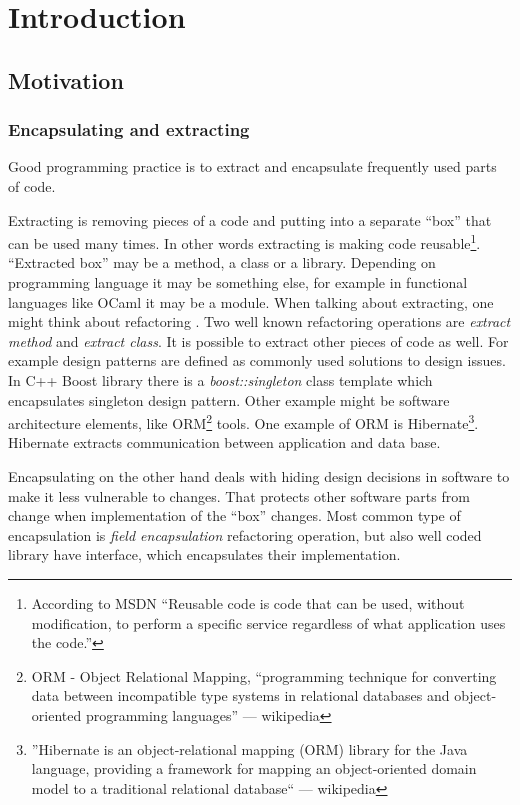 \chapter{Introduction}
\section{Motivation}
\subsection{Encapsulating and extracting}


Good programming practice is to extract and encapsulate frequently used parts of code.

Extracting is removing pieces of a code and putting into a separate ``box'' that can be used many times.
In other words extracting is making code reusable\footnote{According to MSDN ``Reusable code is code that can be used, without modification, to perform a specific service regardless of what application uses the code.''}.
``Extracted box'' may be a method, a class or a library. Depending on programming language it may be something else, 
for example in functional languages like OCaml it may be a module.
When talking about extracting, one might think about refactoring \cite{fowler06}. Two well known refactoring operations are \emph{extract method} and \emph{extract class}. It is possible to extract other pieces of code as well.
For example design patterns \cite{gamma05} are defined as commonly used solutions to design issues. In C++ Boost library there is a \emph{boost::singleton} class template which encapsulates singleton design pattern. Other example might be software architecture elements, like ORM\footnote{ORM - Object Relational Mapping, ``programming technique for converting data between incompatible type systems in relational databases and object-oriented programming languages'' --- wikipedia} tools. One example of ORM is Hibernate\footnote{''Hibernate is an object-relational mapping (ORM) library for the Java language, providing a framework for mapping an object-oriented domain model to a traditional relational database`` --- wikipedia}. Hibernate extracts communication between application and data base.

Encapsulating on the other hand deals with hiding design decisions in software to make it less vulnerable to changes. That protects other software parts from change when implementation of the ``box'' changes. 
Most common type of encapsulation is \emph{field encapsulation} refactoring operation, but also well coded library have interface, which encapsulates their implementation.

